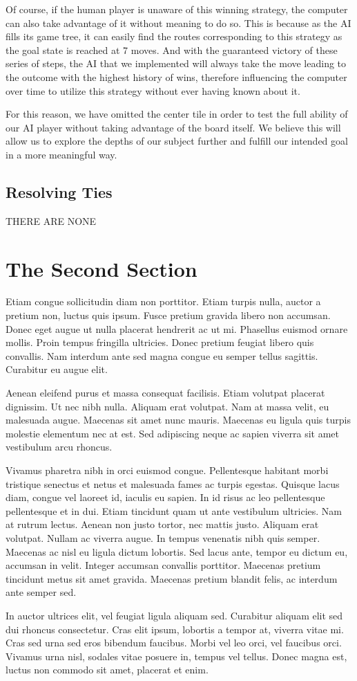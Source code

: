 \documentclass[preprint,12pt]{elsarticle}
\begin{document}
		Of course, if the human player is unaware of this winning strategy, the computer can also take advantage of it without meaning to do so. This is because as the AI fills its game tree, it can easily find the routes corresponding to this strategy as the goal state is reached at 7 moves. And with the guaranteed victory of these series of steps, the AI that we implemented will always take the move leading to the outcome with the highest history of wins, therefore influencing the computer over time to utilize this strategy without ever having known about it.

		For this reason, we have omitted the center tile in order to test the full ability of our AI player without taking advantage of the board itself. We believe this will allow us to explore the depths of our subject further and fulfill our intended goal in a more meaningful way.

	\subsection{Resolving Ties}
		THERE ARE NONE

\section{The Second Section}
	\label{S:2}

	Etiam congue sollicitudin diam non porttitor. Etiam turpis nulla, auctor a pretium non, luctus quis ipsum. Fusce pretium gravida libero non accumsan. Donec eget augue ut nulla placerat hendrerit ac ut mi. Phasellus euismod ornare mollis. Proin tempus fringilla ultricies. Donec pretium feugiat libero quis convallis. Nam interdum ante sed magna congue eu semper tellus sagittis. Curabitur eu augue elit.

	Aenean eleifend purus et massa consequat facilisis. Etiam volutpat placerat dignissim. Ut nec nibh nulla. Aliquam erat volutpat. Nam at massa velit, eu malesuada augue. Maecenas sit amet nunc mauris. Maecenas eu ligula quis turpis molestie elementum nec at est. Sed adipiscing neque ac sapien viverra sit amet vestibulum arcu rhoncus.

	Vivamus pharetra nibh in orci euismod congue. Pellentesque habitant morbi tristique senectus et netus et malesuada fames ac turpis egestas. Quisque lacus diam, congue vel laoreet id, iaculis eu sapien. In id risus ac leo pellentesque pellentesque et in dui. Etiam tincidunt quam ut ante vestibulum ultricies. Nam at rutrum lectus. Aenean non justo tortor, nec mattis justo. Aliquam erat volutpat. Nullam ac viverra augue. In tempus venenatis nibh quis semper. Maecenas ac nisl eu ligula dictum lobortis. Sed lacus ante, tempor eu dictum eu, accumsan in velit. Integer accumsan convallis porttitor. Maecenas pretium tincidunt metus sit amet gravida. Maecenas pretium blandit felis, ac interdum ante semper sed.

	In auctor ultrices elit, vel feugiat ligula aliquam sed. Curabitur aliquam elit sed dui rhoncus consectetur. Cras elit ipsum, lobortis a tempor at, viverra vitae mi. Cras sed urna sed eros bibendum faucibus. Morbi vel leo orci, vel faucibus orci. Vivamus urna nisl, sodales vitae posuere in, tempus vel tellus. Donec magna est, luctus non commodo sit amet, placerat et enim.
\end{document}
